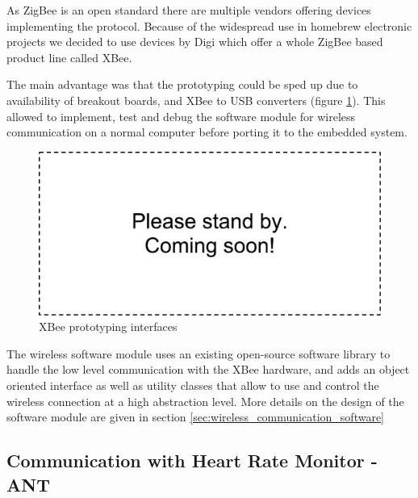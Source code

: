As ZigBee is an open standard there are multiple vendors offering devices implementing the protocol. Because of the widespread use in homebrew electronic projects we decided to use devices by Digi which offer a whole ZigBee based product line called XBee. 

The main advantage was that the prototyping could be sped up due to availability of breakout boards, and XBee to USB converters (figure \ref{fig:xbee_prototyping_interfaces}). This allowed to implement, test and debug the software module for wireless communication on a normal computer before porting it to the embedded system.

\begin{figure}
\includegraphics[width=\textwidth]{Images/dummy}
\caption{XBee prototyping interfaces}
\label{fig:xbee_prototyping_interfaces}
\end{figure}

The wireless software module uses an existing open-source software library to handle the low level communication with the XBee hardware, and adds an object oriented interface as well as utility classes that allow to use and control the wireless connection at a high abstraction level. More details on the design of the software module are given in section \ref{sec:wireless_communication_software}


\subsection{Communication with Heart Rate Monitor - ANT}


